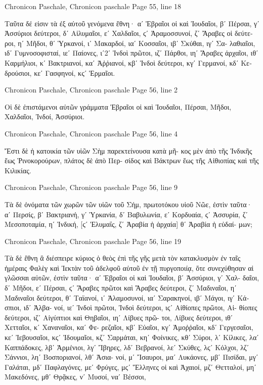 \documentclass[12pt,letterpaper,twoside,final]{memoir}
\begin{document}
\begin{greek}
Chronicon Paschale, Chronicon paschale 
Page 55, line 18


Ταῦτα δέ εἰσιν τὰ ἐξ αὐτοῦ γενόμενα ἔθνη· αʹ Ἑβραῖοι οἱ 
καὶ Ἰουδαῖοι, βʹ Πέρσαι, γʹ Ἀσσύριοι δεύτεροι, δʹ Αἱλυμαῖοι, εʹ 
Χαλδαῖοι, ϛʹ Ἀραμοσσυνοί, ζʹ Ἄραβες οἱ δεύτεροι, ηʹ Μῆδοι, 
θʹ Ὑρκανοί, ιʹ Μακαρδοί, ιαʹ Κοσσαῖοι, ιβʹ Σκύθαι, ιγʹ Σα-
λαθιαῖοι, ιδʹ Γυμνοσοφισταί, ιεʹ Παίονες, ιʹ2ʹ Ἰνδοὶ πρῶτοι, ιζʹ 
Πάρθοι, ιηʹ Ἄραβες ἀρχαῖοι, ιθʹ Καρμήλιοι, κʹ Βακτριανοί, 
καʹ Ἀῤῥιανοί, κβʹ Ἰνδοὶ δεύτεροι, κγʹ Γερμανοί, κδʹ Κεδρούσιοι, 
κεʹ Γασφηνοί, κϛʹ Ἑρμαῖοι. 



Chronicon Paschale, Chronicon paschale 
Page 56, line 2

Οἱ δὲ ἐπιστάμενοι αὐτῶν γράμματα Ἑβραῖοι οἱ καὶ Ἰουδαῖοι, 
Πέρσαι, Μῆδοι, Χαλδαῖοι, Ἰνδοί, Ἀσσύριοι. 



Chronicon Paschale, Chronicon paschale 
Page 56, line 4

Ἔστι δὲ ἡ κατοικία τῶν υἱῶν Σὴμ παρεκτείνουσα κατὰ μῆ-
κος μὲν ἀπὸ τῆς Ἰνδικῆς ἕως Ῥινοκορούρων, πλάτος δὲ ἀπὸ Περ-
σίδος καὶ Βάκτρων ἕως τῆς Αἰθιοπίας καὶ τῆς Κιλικίας. 



Chronicon Paschale, Chronicon paschale 
Page 56, line 9

Τὰ δὲ ὀνόματα τῶν χωρῶν τῶν υἱῶν τοῦ Σήμ, πρωτοτόκου 
υἱοῦ Νῶε, ἐστὶν ταῦτα· αʹ Περσίς, βʹ Βακτριανή, γʹ Ὑρκανία, 
δʹ Βαβυλωνία, εʹ Κορδυαία, ϛʹ Ἀσσυρία, ζʹ Μεσοποταμία, ηʹ 
Ἰνδική, [ϛʹ Ἐλυμαΐς, ζʹ Ἀραβία ἡ ἀρχαία] θʹ Ἀραβία ἡ εὐδαί-
μων; 



Chronicon Paschale, Chronicon paschale 
Page 56, line 19

Τὰ δὲ ἔθνη ἃ διέσπειρε κύριος ὁ θεὸς ἐπὶ τῆς γῆς μετὰ τὸν 
κατακλυσμὸν ἐν ταῖς ἡμέραις Φαλὲγ καὶ Ἰεκτὰν τοῦ ἀδελφοῦ 
αὐτοῦ ἐν τῇ πυργοποιίᾳ, ὅτε συνεχύθησαν αἱ γλῶσσαι αὐτῶν, 
ἐστὶν ταῦτα· αʹ Ἑβραῖοι οἱ καὶ Ἰουδαῖοι, βʹ Ἀσσύριοι, γʹ Χαλ-
δαῖοι, δʹ Μῆδοι, εʹ Πέρσαι, ϛʹ Ἄραβες πρῶτοι καὶ Ἄραβες 
δεύτεροι, ζʹ Μαδιναῖοι, ηʹ Μαδιναῖοι δεύτεροι, θʹ Ταϊανοί, ιʹ 
Ἀλαμοσυνοί, ιαʹ Σαρακηνοί, ιβʹ Μάγοι, ιγʹ Κάσπιοι, ιδʹ Ἀλβα-
νοί, ιεʹ Ἰνδοὶ πρῶτοι, Ἰνδοὶ δεύτεροι, ιϛʹ Αἰθίοπες πρῶτοι, Αἰ-
θίοπες δεύτεροι, ιζʹ Αἰγύπτιοι καὶ Θηβαῖοι, ιηʹ Λίβυες πρῶ-
τοι, Λίβυες δεύτεροι, ιθʹ Χετταῖοι, κʹ Χαναναῖοι, καʹ Φε-  
ρεζαῖοι, κβʹ Εὐαῖοι, κγʹ Ἀμοῤῥαῖοι, κδʹ Γεργεσαῖοι, κεʹ Ἰεβουσαῖοι, 
κϛʹ Ἰδουμαῖοι, κζʹ Σαρμάται, κηʹ Φοίνικες, κθʹ Σύροι, λʹ Κίλικες, 
λαʹ Καππάδοκες, λβʹ Ἀρμένιοι, λγʹ Ἴβηρες, λδʹ Βεβρανοί, λεʹ 
Σκύθες, λϛʹ Κόλχοι, λζʹ Σάννιοι, ληʹ Βοσποριανοί, λθʹ Ἀσια-
νοί, μʹ Ἴσαυροι, μαʹ Λυκάονες, μβʹ Πισίδαι, μγʹ Γαλάται, 
μδʹ Παφλαγόνες, μεʹ Φρύγες, μϛʹ Ἕλληνες οἱ καὶ Ἀχαιοί, μζʹ 
Θετταλοί, μηʹ Μακεδόνες, μθʹ Θρᾷκες, νʹ Μυσοί, ναʹ Βέσσοι, 





\end{greek}
\end{document}
